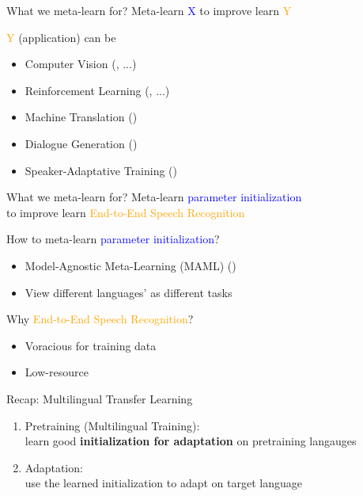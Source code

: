 \documentclass{beamer}
\begin{document}
\begin{frame}[t]{What we meta-learn for?}
  \centering Meta-learn \textcolor{blue}{X} to improve learn \textcolor{orange}{Y}

  \flushleft \textcolor{orange}{Y} (application) can be
  \begin{itemize}
    \item Computer Vision (\citealt{snell2017prototypical}, \citealt{rusu2018meta} ...)
    \item Reinforcement Learning (\citealt{eysenbach2018diversity}, \citealt{xu2018meta} ...)
    \item Machine Translation (\citealt{gu2018meta})
    \item Dialogue Generation (\citealt{mi2019meta})
    \item Speaker-Adaptative Training (\citealt{klejch2019speaker})
  \end{itemize}
\end{frame}

\begin{frame}[t]{What we meta-learn for?}
  \centering Meta-learn \textcolor{blue}{parameter initialization} \\ to improve learn \textcolor{orange}{End-to-End Speech Recognition}

  \pause
  \flushleft How to meta-learn \textcolor{blue}{parameter initialization}?
  \begin{itemize}
    \item Model-Agnostic Meta-Learning (MAML) (\citealt{finn2017model})
    \item View different languages' as different tasks
  \end{itemize}

  \pause

  Why \textcolor{orange}{End-to-End Speech Recognition}?
  \begin{itemize}
    \item Voracious for training data
    \item Low-resource 
  \end{itemize}
\end{frame}


\begin{frame}[t]{Recap: Multilingual Transfer Learning}

  \begin{enumerate}
    \item Pretraining (Multilingual Training): \\ learn good \textbf{initialization for adaptation} on pretraining langauges
    \item Adaptation: \\ use the learned initialization to adapt on target language
  \end{enumerate}
\end{frame}
\end{document}
